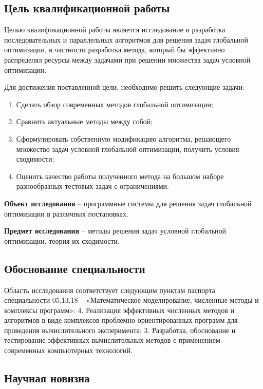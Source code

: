 \subsection*{Цель квалификационной работы}

Целью квалификационной работы является исследование и разработка последовательных и параллельных алгоритмов для
решения задач глобальной оптимизации, в частности разработка метода, который бы эффективно распределял ресурсы между задачами при
решении множества задач условной оптимизации.

Для достижения поставленной цели, необходимо решить следующие задачи:
\begin{enumerate}
    \item Сделать обзор современных методов глобальной оптимизации;
    \item Сравнить актуальные методы между собой;
    \item Сформулировать собственную модификацию алгоритма, решающего множество задач условной глобальной оптимизации,
    получить условия сходимости;
    \item Оценить качество работы полученного метода на большом наборе разнообразных тестовых задач с ограничениями.
\end{enumerate}

\textbf{Объект исследования} -- программные системы для решения задач глобальной оптимизации в различных постановках.

\textbf{Предмет исследования} -- методы решения задач условной глобальной оптимизации, теория их сходимости.

\subsection*{Обоснование специальности}

Область исследования соответствует следующим пунктам паспорта специальности 05.13.18 --
«Математическое моделирование, численные методы и комплексы программ»:
4. Реализация эффективных численных методов и алгоритмов в виде
комплексов проблемно-ориентированных программ для проведения
вычислительного эксперимента; 3. Разработка, обоснование и тестирование эффективных вычислительных
методов с применением современных компьютерных технологий.

\subsection*{Научная новизна}

